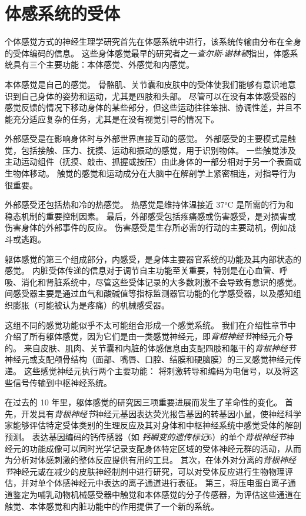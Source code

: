 \chapter{体感系统的受体} \label{chap:chap18}

个体感觉方式的神经生理学研究首先在体感系统中进行，该系统传输由分布在全身的受体编码的信息。
这些身体感觉最早的研究者之一\textit{查尔斯$\cdot$谢林顿}指出，体感系统具有三个主要功能：本体感觉、外感觉和内感觉。


本体感觉是自己的感觉。
骨骼肌、关节囊和皮肤中的受体使我们能够有意识地意识到自己身体的姿势和运动，尤其是四肢和头部。
尽管可以在没有本体感受器的感觉反馈的情况下移动身体的某些部分，但这些运动往往笨拙、协调性差，并且不能充分适应复杂的任务，尤其是在没有视觉引导的情况下。


外部感受是在影响身体时与外部世界直接互动的感觉。
外部感受的主要模式是触觉，包括接触、压力、抚摸、运动和振动的感觉，用于识别物体。
一些触觉涉及主动运动组件（抚摸、敲击、抓握或按压）由此身体的一部分相对于另一个表面或生物体移动。
触觉的感觉和运动成分在大脑中在解剖学上紧密相连，对指导行为很重要。


外部感受还包括热和冷的热感觉。
热感觉是维持体温接近 37°C 是所需的行为和稳态机制的重要控制因素。
最后，外部感受包括疼痛感或伤害感受，是对损害或伤害身体的外部事件的反应。
伤害感受是生存所必需的行动的主要动机，例如战斗或逃跑。


躯体感觉的第三个组成部分，内感受，是身体主要器官系统的功能及其内部状态的感觉。
内脏受体传递的信息对于调节自主功能至关重要，特别是在心血管、呼吸、消化和肾脏系统中，尽管这些受体记录的大多数刺激不会导致有意识的感觉。
间感受器主要是通过血气和酸碱值等指标监测器官功能的化学感受器，以及感知组织膨胀（可能被认为是疼痛）的机械感受器。


这组不同的感觉功能似乎不太可能组合形成一个感觉系统。
我们在介绍性章节中介绍了所有躯体感觉，因为它们是由一类感觉神经元，即\textit{背根神经节}神经元介导的。
来自皮肤、肌肉、关节囊和内脏的体感信息由支配四肢和躯干的\textit{背根神经节}神经元或支配颅骨结构（面部、嘴唇、口腔、结膜和硬脑膜）的三叉感觉神经元传递。
这些感觉神经元执行两个主要功能：
将刺激转导和编码为电信号，以及将这些信号传输到中枢神经系统。


在过去的 10 年里，躯体感觉的研究因三项重要进展而发生了革命性的变化。 
首先，开发具有\textit{背根神经节}神经元基因表达荧光报告基因的转基因小鼠，使神经科学家能够评估特定受体类别的生理反应及其对身体和中枢神经系统中感觉受体的解剖预测。
表达基因编码的钙传感器（如 \textit{钙瞬变的遗传标记}6）的单个\textit{背根神经节}神经元的功能成像可以同时光学记录支配身体特定区域的受体神经元群的活动，从而为分析对体感刺激的整体反应提供有用的工具。
其次，在体外对分离的\textit{背根神经节}神经元或在减少的皮肤神经制剂中进行研究，可以对受体反应进行生物物理评估，并对单个体感神经元中表达的离子通道进行表征。
第三，将压电蛋白离子通道鉴定为哺乳动物机械感受器中触觉和本体感觉的分子传感器，为评估这些通道在触觉、本体感觉和内脏功能中的作用提供了一个新的系统。


